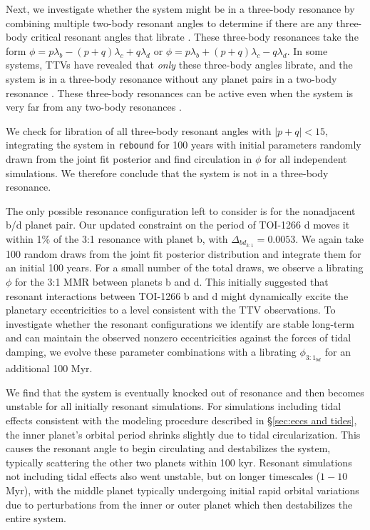 \documentclass[twocolumn]{aastex631}
\begin{document}
Next, we investigate whether the system might be in a three-body resonance by combining multiple two-body resonant angles to determine if there are any three-body critical resonant angles that librate \citep[e.g. Kepler-223,][]{Mills16}. These three-body resonances take the form $\phi = p\lambda_{b} - (p+q)\lambda_{c} + q\lambda_{d}$ or $\phi = p\lambda_b + (p+q)\lambda_c - q\lambda_d$. In some systems, TTVs have revealed that \textit{only} these three-body angles librate, and the system is in a three-body resonance without any planet pairs in a two-body resonance \citep{Godziewski15,Mills16,MacDonald16}. These three-body resonances can be active even when the system is very far from any two-body resonances \citep[e.g., Kepler-221,][]{Goldberg_2021}.

We check for libration of all three-body resonant angles with $|p+q| < 15$, integrating the system in \texttt{rebound} for 100 years with initial parameters randomly drawn from the joint fit posterior and find circulation in $\phi$ for all independent simulations. We therefore conclude that the system is not in a three-body resonance.

The only possible resonance configuration left to consider is for the nonadjacent b/d planet pair. Our updated constraint on the period of TOI-1266 d moves it within 1\% of the 3:1 resonance with planet b, with $\Delta_{bd_{3:1}} = 0.0053$. We again take 100 random draws from the joint fit posterior distribution and integrate them for an initial 100 years. For a small number of the total draws, we observe a librating $\phi$ for the 3:1 MMR between planets b and d. This initially suggested that resonant interactions between TOI-1266 b and d might dynamically excite the planetary eccentricities to a level consistent with the TTV observations. To investigate whether the resonant configurations we identify are stable long-term and can maintain the observed nonzero eccentricities against the forces of tidal damping, we evolve these parameter combinations with a librating $\phi_{3:1_{bd}}$ for an additional 100 Myr. 

We find that the system is eventually knocked out of resonance and then becomes unstable for all initially resonant simulations. For simulations including tidal effects consistent with the modeling procedure described in \S\ref{sec:eccs and tides}, the inner planet's orbital period shrinks slightly due to tidal circularization. This causes the resonant angle to begin circulating and destabilizes the system, typically scattering the other two planets within 100 kyr. Resonant simulations not including tidal effects also went unstable, but on longer timescales ($1 - 10$ Myr), with the middle planet typically undergoing initial rapid orbital variations due to perturbations from the inner or outer planet which then destabilizes the entire system.
\end{document}
